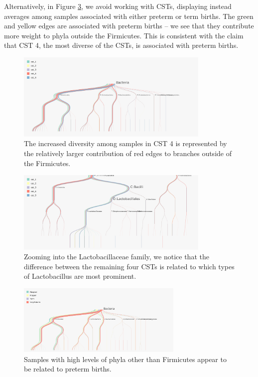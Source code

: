 \documentclass[12pt]{article}
\begin{document}
Alternatively, in Figure \ref{fig:pretermpreterm}, we avoid working with CSTs,
displaying instead averages among samples associated with either preterm or term
births. The green and yellow edges are associated with preterm births -- we see
that they contribute more weight to phyla outside the Firmicutes. This is
consistent with the claim that CST 4, the most diverse of the CSTs, is
associated with preterm births.

\begin{figure}

{\centering \includegraphics[width=350px]{figure/preterm_csts}

}

\caption{The increased diversity among samples in CST 4 is represented by the relatively larger contribution of red edges to branches outside of the Firmicutes.}\label{fig:pretermcsts}
\end{figure}

\begin{figure}

{\centering \includegraphics[width=350px]{figure/preterm_csts_lacto}

}

\caption{Zooming into the Lactobacillaceae family, we notice that the difference between the remaining four CSTs is related to which types of Lactobacillus are most prominent.}\label{fig:pretermcstslacto}
\end{figure}

\begin{figure}

{\centering \includegraphics[width=300px]{figure/preterm_preterm}

}

\caption{Samples with high levels of phyla other than Firmicutes appear to be related to preterm births.}\label{fig:pretermpreterm}
\end{figure}
\end{document}
